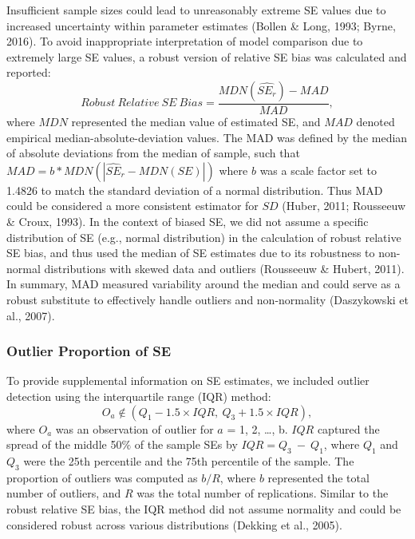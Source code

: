 \documentclass[
  man]{apa6}
\begin{document}
Insufficient sample sizes could lead to unreasonably extreme SE values due to increased uncertainty within parameter estimates (Bollen \& Long, 1993; Byrne, 2016). To avoid inappropriate interpretation of model comparison due to extremely large SE values, a robust version of relative SE bias was calculated and reported:
\begin{equation}
Robust\ Relative\ SE\ Bias = \frac{MDN(\widehat{SE_{r}}) - MAD}{MAD},
\end{equation}
where \(MDN\) represented the median value of estimated SE, and \(MAD\) denoted empirical median-absolute-deviation values. The MAD was defined by the median of absolute deviations from the median of sample, such that \(MAD = b*MDN(|\widehat{SE}_{r} - MDN(SE)|)\) where \(b\) was a scale factor set to 1.4826 to match the standard deviation of a normal distribution. Thus MAD could be considered a more consistent estimator for \(SD\) (Huber, 2011; Rousseeuw \& Croux, 1993). In the context of biased SE, we did not assume a specific distribution of SE (e.g., normal distribution) in the calculation of robust relative SE bias, and thus used the median of SE estimates due to its robustness to non-normal distributions with skewed data and outliers (Rousseeuw \& Hubert, 2011). In summary, MAD measured variability around the median and could serve as a robust substitute to effectively handle outliers and non-normality (Daszykowski et al., 2007).

\subsubsection{Outlier Proportion of SE}\label{outlier-proportion-of-se}

To provide supplemental information on SE estimates, we included outlier detection using the interquartile range (IQR) method:
\begin{equation}
O_{a} \not\in (Q_{1} - 1.5 \times IQR, \ Q_{3} + 1.5 \times IQR),
\end{equation}
where \(O_{a}\) was an observation of outlier for \(a\) = 1, 2, \ldots, b. \(IQR\) captured the spread of the middle 50\(\%\) of the sample SEs by \(IQR = Q_{3} \ - \ Q_{1}\), where \(Q_{1}\) and \(Q_{3}\) were the 25th percentile and the 75th percentile of the sample. The proportion of outliers was computed as \(b/R\), where \(b\) represented the total number of outliers, and \(R\) was the total number of replications. Similar to the robust relative SE bias, the IQR method did not assume normality and could be considered robust across various distributions (Dekking et al., 2005).
\end{document}
